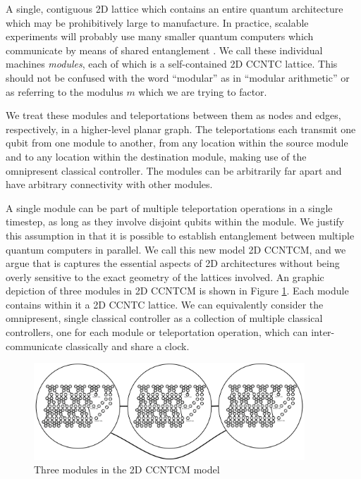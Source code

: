 A single, contiguous
2D lattice which contains an entire quantum architecture which may be prohibitively large to manufacture. In practice,
scalable experiments will probably use many
smaller quantum computers which communicate by means of shared
entanglement \cite{Monroe2012}.
We call these individual machines \emph{modules}, each of
which is a self-contained \textsc{2D CCNTC} lattice. This should not be
confused with the word ``modular'' as in ``modular arithmetic'' or as
referring to the modulus $m$ which we are trying to factor.

We treat these modules
and teleportations between them as nodes and edges, respectively,
in a higher-level planar graph. The teleportations each transmit one qubit
from one module to another, from any location within the source module and
to any location within the destination module, making use of the
omnipresent classical controller. The modules can be arbitrarily far
apart and have arbitrary
connectivity with other modules.

A single module can be part of multiple teleportation operations in a single timestep, as long as they involve disjoint qubits within the module.
We justify this assumption in that it is
possible to establish entanglement between multiple
quantum computers
in parallel. We call this new model \textsc{2D CCNTCM},
and we argue that is captures the essential aspects of 2D architectures
without being overly sensitive to the exact geometry of the lattices involved.
An graphic depiction of three modules in \textsc{2D CCNTCM} is shown in
Figure \ref{fig:modules}. Each module contains within it a
\textsc{2D CCNTC} lattice. We can equivalently consider the omnipresent,
single
classical controller as a collection of multiple classical controllers, one
for each module or teleportation operation, which can inter-communicate
classically and share a clock.

\begin{figure}[btp!]
\begin{center}
\includegraphics[width=4in]{figures/modules.pdf}
\end{center}
\caption{Three modules in the \textsc{2D CCNTCM} model}
\label{fig:modules}
\end{figure}


